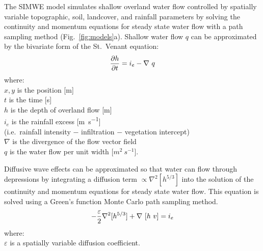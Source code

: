 \documentclass[gmd, manuscript]{copernicus}
\begin{document}
The SIMWE model
simulates shallow overland water flow
controlled by spatially variable topographic, soil, landcover, 
and rainfall parameters
by solving the continuity and momentum equations 
for steady state water flow with a path sampling method
(Fig.~\ref{fig:models}a). 
Shallow water flow $q$ can be approximated by
the bivariate form of the St.~Venant equation:
\begin{equation}
\label{eq:water}
{\partial h \over \partial t} =
 i_e - \nabla ~ q
\end{equation}
{\small
\noindent
where: \\
\noindent
\hspace*{0.5em} $x, y$ is the position [\unit{m}]\\
\hspace*{0.5em} $t$ is the time [\unit{s}] \\
\hspace*{0.5em} $h$ is the depth of overland flow [\unit{m}]\\
\hspace*{0.5em} $i_e$ is the rainfall excess [\unit{m~s^{-1}}] \\
\hspace*{0.5em} (i.e.~rainfall intensity $-$ infiltration $-$ vegetation intercept)\\
\hspace*{0.5em} $\nabla$ is the divergence of the flow vector field\\
\hspace*{0.5em} $q$ is the water flow per unit width [$\unit{m}^2~\unit{s}^{-1}$]. \\
}

\noindent
Diffusive wave effects can be approximated
so that water can flow through depressions 
by integrating a diffusion term 
$ \propto \nabla^2 [h^{5/3}]$
into the solution of the continuity and momentum equations 
for steady state water flow.
This equation is solved using a 
Green's function Monte Carlo path sampling method. 
\begin{equation}
\label{eq:difwater}
-{\varepsilon\over 2 }\nabla^2 [h^{5/3}]
+\nabla ~ [ h~v] = i_e
\end{equation}
{\small
\noindent
 where: \\
 \noindent
 \hspace*{0.5em} $\varepsilon$ is a spatially variable diffusion coefficient. \\
}

\end{document}
